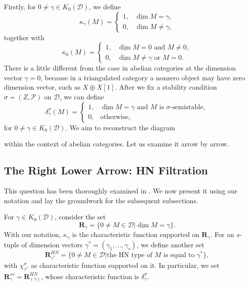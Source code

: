 \documentclass[a4paper,12pt]{amsart}
\newcommand{\udv}{\underline{\dim}}
\begin{document}
Firstly, for $0\neq\gamma\in K_0(\mathcal{D})$, we define
\[\kappa_\gamma(M)=\begin{cases}
    1,&\udv M=\gamma,\\
    0,&\udv M\neq\gamma,
\end{cases}\]
together with
\[\kappa_0(M)=\begin{cases}
    1,&\udv M=0\text{ and }M\neq0,\\
    0,&\udv M\neq\gamma\text{ or }M=0.
\end{cases}\]
There is a little different from the case in abelian categories at the dimension vector $\gamma=0$, because in a triangulated category a nonzero object may have zero dimension vector, such as  $X\oplus X[1]$. After we fix a stability condition $\sigma=(Z,\mathcal{P})$ on $\mathcal{D}$, we can define
\[\delta^\sigma_\gamma(M)=\begin{cases}
    1,&\udv M=\gamma\text{ and $M$ is $\sigma$-semistable},\\
    0,&\text{otherwise},
\end{cases}\]
for $0\neq\gamma\in K_0(\mathcal{D})$.
We aim to reconstruct the diagram
\begin{center}
\end{center}
within the context of abelian categories. Let us examine it arrow by arrow.
\subsection{The Right Lower Arrow: HN Filtration}
This question has been thoroughly examined in \cite{WC2023}. We now present it using our notation and lay the groundwork for the subsequent subsections.

For $\gamma\in K_0(\mathcal{D})$, consider the set
\[\mathbf{R}_\gamma=\{0\neq M\in\mathcal{D}|\udv M=\gamma\}.\]
With our notation, $\kappa_\gamma$ is the characteristic function supported on $\mathbf{R}_\gamma$. For an $s$-tuple of dimension vectors $\gamma^*=(\gamma_1,\dots,\gamma_s)$, we define
another set
\[\mathbf{R}_{\gamma^*}^{HN}=\{0\neq M\in\mathcal{D}|\text{the HN type of $M$ is equal to $\gamma^*$}\},\]
with $\chi^\sigma_{\gamma^*}$ as characteristic function supported on it. In particular, we set $\mathbf{R}_\gamma^{ss}=\mathbf{R}_{(\gamma)}^{HN}$, whose characteristic function is $\delta^\sigma_\gamma$.
\end{document}
